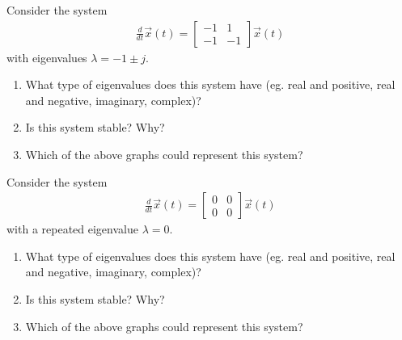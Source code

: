 \begin{enumerate}
    \qitem Consider the system
    \begin{align*}
        \frac{d}{dt} \vec{x}(t) = \begin{bmatrix}
            -1 & 1 \\
            -1 & -1
        \end{bmatrix} \vec{x}(t)
    \end{align*}
    with eigenvalues $\lambda = -1 \pm j$.
    \begin{enumerate}
        \item What type of eigenvalues does this system have (eg. real and positive, real and negative, imaginary, complex)?
        \item Is this system stable? Why?
        \item Which of the above graphs could represent this system?
    \end{enumerate}

    \qitem Consider the system
    \begin{align*}
        \frac{d}{dt} \vec{x}(t) = \begin{bmatrix}
            0 & 0 \\
            0 & 0
        \end{bmatrix} \vec{x}(t)
    \end{align*}
    with a repeated eigenvalue $\lambda = 0$.
    \begin{enumerate}
        \item What type of eigenvalues does this system have (eg. real and positive, real and negative, imaginary, complex)?
        \item Is this system stable? Why?
        \item Which of the above graphs could represent this system?
    \end{enumerate}


\end{enumerate}

